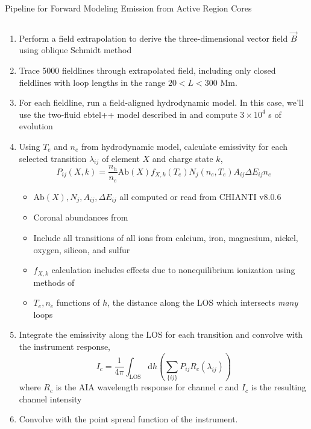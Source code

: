 \documentclass[final,12pt]{beamer}
\begin{document}
\begin{frame}
\begin{columns}[T]
\begin{column}{0.49\linewidth}
\begin{block}{Pipeline for Forward Modeling Emission from Active Region Cores}
\begin{columns}[c]
\begin{column}{0.65\columnwidth}
\begin{enumerate}
          \item Perform a field extrapolation to derive the three-dimensional vector field $\vec{B}$ using oblique Schmidt method \citep{schmidt_observable_1964}
          \item Trace 5000 fieldlines through extrapolated field, including only closed fieldlines  with loop lengths in the range $20<L<300$ Mm.
          \item For each fieldline, run a field-aligned hydrodynamic model. In this case, we'll use the two-fluid ebtel++ model described in \citet{barnes_inference_2016} and compute $3\times10^4$ s of evolution
          \item Using $T_e$ and $n_e$ from hydrodynamic model, calculate emissivity for each selected transition $\lambda_{ij}$ of element $X$ and charge state $k$,
            \begin{equation*}
              P_{ij}(X,k) = \frac{n_h}{n_e}\text{Ab}(X)f_{X,k}(T_e)N_j(n_e,T_e)A_{ij}\Delta E_{ij}n_e
            \end{equation*}
            \begin{itemize}
              \item $\text{Ab}(X),N_j,A_{ij},\Delta E_{ij}$ all computed or read from CHIANTI v8.0.6 \citep{young_chianti_2016,dere_chianti_1997}
              \item Coronal abundances from \citet{feldman_potential_1992}
              \item Include all transitions of all ions from calcium, iron, magnesium, nickel, oxygen, silicon, and sulfur
              \item $f_{X,k}$ calculation includes effects due to nonequilibrium ionization using methods of \citep{bradshaw_numerical_2009}
              \item $T_e,n_e$ functions of $h$, the distance along the LOS which intersects \textit{many} loops
            \end{itemize}
          \item Integrate the emissivity along the LOS for each transition and convolve with the instrument response,
            \begin{equation*}
              I_c = \frac{1}{4\pi}\int_{\text{LOS}}\text{d}h\left(\sum_{\{ij\}}P_{ij}R_c(\lambda_{ij})\right)
            \end{equation*}
            where $R_c$ is the AIA wavelength response for channel $c$ and $I_c$ is the resulting channel intensity
          \item Convolve with the point spread function of the instrument.

\end{enumerate}
\end{column}
\end{columns}
\end{block}
\end{column}
\end{columns}
\end{frame}
\end{document}
